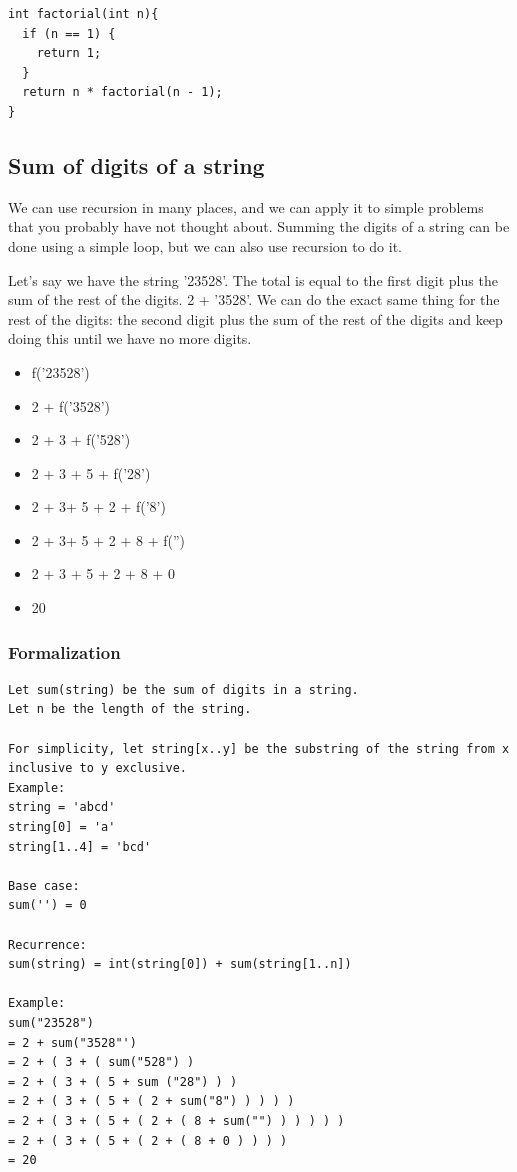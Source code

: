\documentclass[11pt,oneside]{book}
\begin{document}
\begin{lstlisting}
int factorial(int n){
  if (n == 1) {
    return 1;
  }
  return n * factorial(n - 1);
}
\end{lstlisting}

\subsection{Sum of digits of a string}

We can use recursion in many places, and we can apply it to simple problems that you probably have not thought about. Summing the digits of a string can be done using a simple loop, but we can also use recursion to do it.

Let's say we have the string '23528'. The total is equal to the first digit plus the sum of the rest of the digits. 2 + '3528'. We can do the exact same thing for the rest of the digits: the second digit plus the sum of the rest of the digits and keep doing this until we have no more digits.

\begin{itemize}
\item f('23528')
\item 2 + f('3528')
\item 2 + 3 + f('528')
\item 2 + 3 + 5 + f('28')
\item 2 + 3+ 5 + 2 + f('8') 
\item 2 + 3+ 5 + 2 + 8 + f('')
\item 2 + 3 + 5 + 2 + 8 + 0
\item 20
\end{itemize}

\subsubsection{Formalization}

\begin{lstlisting}
Let sum(string) be the sum of digits in a string.
Let n be the length of the string.

For simplicity, let string[x..y] be the substring of the string from x inclusive to y exclusive.
Example: 
string = 'abcd'
string[0] = 'a'
string[1..4] = 'bcd'

Base case:
sum('') = 0

Recurrence:
sum(string) = int(string[0]) + sum(string[1..n])

Example:
sum("23528")
= 2 + sum("3528"')
= 2 + ( 3 + ( sum("528") )
= 2 + ( 3 + ( 5 + sum ("28") ) )
= 2 + ( 3 + ( 5 + ( 2 + sum("8") ) ) ) )
= 2 + ( 3 + ( 5 + ( 2 + ( 8 + sum("") ) ) ) ) )
= 2 + ( 3 + ( 5 + ( 2 + ( 8 + 0 ) ) ) )
= 20
\end{lstlisting}
\end{document}
